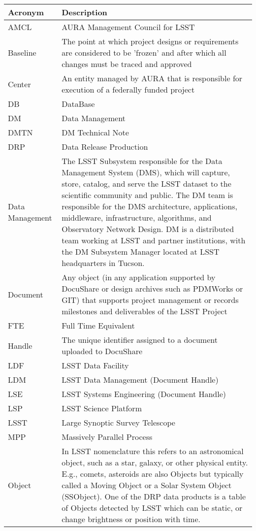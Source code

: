 \addtocounter{table}{-1}
\begin{longtable}{|l|p{}|}\hline
\textbf{Acronym} & \textbf{Description}  \\\hline

AMCL & AURA Management Council for LSST \\\hline
Baseline & The point at which project designs or requirements are considered to be 'frozen' and after which all changes must be traced and approved \\\hline
Center & An entity managed by AURA that is responsible for execution of a federally funded project \\\hline
DB & DataBase \\\hline
DM & Data Management \\\hline
DMTN & DM Technical Note \\\hline
DRP & Data Release Production \\\hline
Data Management & The LSST Subsystem responsible for the Data Management System (DMS), which will capture, store, catalog, and serve the LSST dataset to the scientific community and public. The DM team is responsible for the DMS architecture, applications, middleware, infrastructure, algorithms, and Observatory Network Design. DM is a distributed team working at LSST and partner institutions, with the DM Subsystem Manager located at LSST headquarters in Tucson. \\\hline
Document & Any object (in any application supported by DocuShare or design archives such as PDMWorks or GIT) that supports project management or records milestones and deliverables of the LSST Project \\\hline
FTE & Full Time Equivalent \\\hline
Handle & The unique identifier assigned to a document uploaded to DocuShare \\\hline
LDF & LSST Data Facility \\\hline
LDM & LSST Data Management (Document Handle) \\\hline
LSE & LSST Systems Engineering (Document Handle) \\\hline
LSP & LSST Science Platform \\\hline
LSST & Large Synoptic Survey Telescope \\\hline
MPP & Massively Parallel Process \\\hline
Object & In LSST nomenclature this refers to an astronomical object, such as a star, galaxy, or other physical entity. E.g., comets, asteroids are also Objects but typically called a Moving Object or a Solar System Object (SSObject). One of the DRP data products is a table of Objects detected by LSST which can be static, or change brightness or position with time. \\\hline

\end{longtable}

